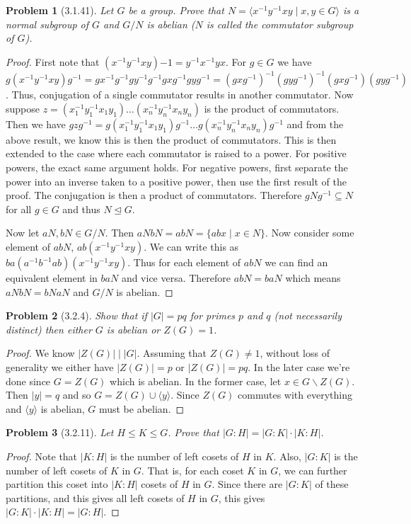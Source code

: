 \documentclass{article}
\newtheorem{problem}{Problem}
\newcommand{\normal}{\unlhd}
\begin{document}
\begin{problem}[3.1.41]
Let $G$ be a group. Prove that $N = \langle x^{-1}y^{-1}xy \mid x,y \in G \rangle$ is a normal subgroup of $G$ and $G/N$ is abelian ($N$ is called the \emph{commutator subgroup} of $G$).
\end{problem}
\begin{proof}
First note that $(x^{-1}y^{-1}xy){-1} = y^{-1}x^{-1}yx$. For $g \in G$ we have $g(x^{-1}y^{-1}xy)g^{-1} = gx^{-1}g^{-1}gy^{-1}g^{-1}gxg^{-1}gyg^{-1} = (gxg^{-1})^{-1}(gyg^{-1})^{-1}(gxg^{-1})(gyg^{-1})$. Thus, conjugation of a single commutator results in another commutator. Now suppose $z = (x_1^{-1}y_1^{-1}x_1y_1) \dots (x_n^{-1}y_n^{-1}x_ny_n)$ is the product of commutators. Then we have $gzg^{-1} = g(x_1^{-1}y_1^{-1}x_1y_1)g^{-1} \dots g(x_n^{-1}y_n^{-1}x_ny_n)g^{-1}$ and from the above result, we know this is then the product of commutators. This is then extended to the case where each commutator is raised to a power. For positive powers, the exact same argument holds. For negative powers, first separate the power into an inverse taken to a positive power, then use the first result of the proof. The conjugation is then a product of commutators. Therefore $gNg^{-1} \subseteq N$ for all $g \in G$ and thus $N \normal G$.

Now let $aN, bN \in G/N$. Then $aNbN = abN = \{abx \mid x \in N\}$. Now consider some element of $abN$, $ab(x^{-1}y^{-1}xy)$. We can write this as $ba(a^{-1}b^{-1}ab)(x^{-1}y^{-1}xy)$. Thus for each element of $abN$ we can find an equivalent element in $baN$ and vice versa. Therefore $abN = baN$ which means $aNbN = bNaN$ and $G/N$ is abelian.
\end{proof}

\begin{problem}[3.2.4]
Show that if $|G| = pq$ for primes $p$ and $q$ (not necessarily distinct) then either $G$ is abelian or $Z(G) = 1$.
\end{problem}
\begin{proof}
We know $|Z(G)| \mid |G|$. Assuming that $Z(G) \neq 1$, without loss of generality we either have $|Z(G)| = p$ or $|Z(G)| = pq$. In the later case we're done since $G = Z(G)$ which is abelian. In the former case, let $x \in G \backslash Z(G)$. Then $|y| = q$ and so $G = Z(G) \cup \langle y \rangle$. Since $Z(G)$ commutes with everything and $\langle y \rangle$ is abelian, $G$ must be abelian.
\end{proof}

\begin{problem}[3.2.11]
Let $H \leq K \leq G$. Prove that $|G : H| = |G : K| \cdot |K : H|$.
\end{problem}
\begin{proof}
Note that $|K : H|$ is the number of left cosets of $H$ in $K$. Also, $|G : K|$ is the number of left cosets of $K$ in $G$. That is, for each coset $K$ in $G$, we can further partition this coset into $|K : H|$ cosets of $H$ in $G$. Since there are $|G : K|$ of these partitions, and this gives all left cosets of $H$ in $G$, this gives $|G : K| \cdot |K : H| = |G : H|$.
\end{proof}
\end{document}

